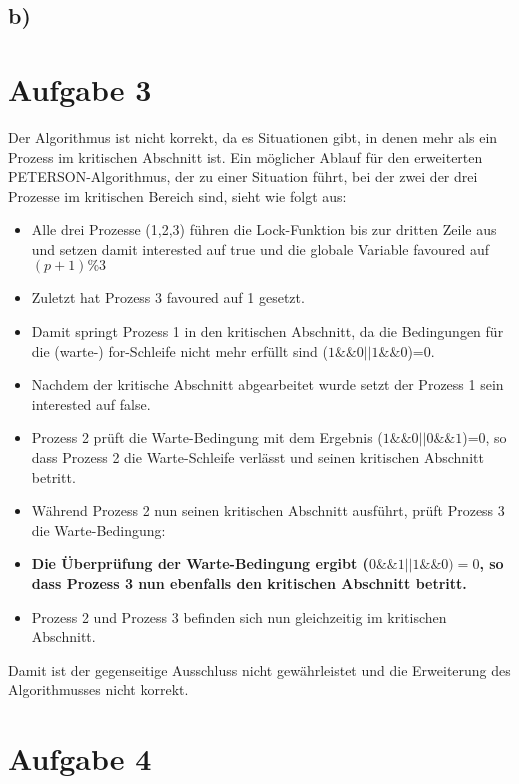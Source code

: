 \documentclass[11pt,a4paper,DIV=10,]{scrartcl}
\begin{document}
\subsection*{b)}

\section*{Aufgabe 3}
Der Algorithmus ist nicht korrekt, da es Situationen gibt, in denen mehr als ein Prozess im kritischen Abschnitt ist. Ein möglicher Ablauf für den erweiterten PETERSON-Algorithmus, der zu einer Situation führt, bei der zwei der drei Prozesse im kritischen Bereich sind, sieht wie folgt aus: 

\begin{itemize}
 \item Alle drei Prozesse (1,2,3) führen die Lock-Funktion bis zur dritten Zeile aus und setzen damit interested auf true und die globale Variable favoured auf $(p+1)\%3$ 
 \item Zuletzt hat Prozess 3 favoured auf 1 gesetzt. 
 \item Damit springt Prozess 1 in den kritischen Abschnitt, da die Bedingungen für die (warte-) for-Schleife nicht mehr erfüllt sind ($1 \&\& 0 || 1  \&\& 0$)=0.
 \item Nachdem der kritische Abschnitt abgearbeitet wurde setzt der Prozess 1 sein interested auf false. 
 \item Prozess 2 prüft die Warte-Bedingung mit dem Ergebnis ($1 \&\& 0 || 0 \&\& 1$)=0, so dass Prozess 2 die Warte-Schleife verlässt und seinen kritischen Abschnitt betritt. 
 \item Während Prozess 2 nun seinen kritischen Abschnitt ausführt, prüft Prozess 3 die Warte-Bedingung:
 \item \textbf{Die Überprüfung der Warte-Bedingung ergibt ($0 \&\& 1 || 1 \&\& 0)=0$, so dass Prozess 3 nun ebenfalls den kritischen Abschnitt betritt.}
 \item Prozess 2 und Prozess 3 befinden sich nun gleichzeitig im kritischen Abschnitt. 
 \end{itemize}

Damit ist der gegenseitige Ausschluss nicht gewährleistet und die Erweiterung des Algorithmusses nicht korrekt. 

\section*{Aufgabe 4}
\end{document}
